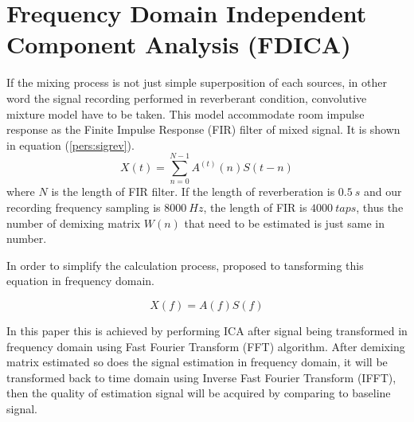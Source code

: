 \documentclass[a4paper]{jpconf}
\begin{document}
\section{Frequency Domain Independent Component Analysis (FDICA)}
If the mixing process is not just simple superposition of each sources, in other word the signal recording performed in reverberant condition, convolutive mixture model have to be taken. This model accommodate room impulse response as the Finite Impulse Response (FIR) filter of mixed signal. It is shown in equation (\ref{pers:sigrev}).
\begin{equation}\label{pers:sigrev}
X(t) = \sum_{n=0}^{N-1}A^{(t)}(n)S(t-n)
\end{equation}
where $N$ is the length of FIR filter. If the length of reverberation is $0.5~s$ and our recording frequency sampling is $8000~Hz$, the length of FIR is $4000~taps$, thus the number of demixing matrix $W(n)$ that need to be estimated is just same in number.

In order to simplify the calculation process, \cite{6} proposed to tansforming this equation in frequency domain.

\begin{equation}
X(f)=A(f)S(f)
\end{equation}

In this paper this is achieved by performing ICA after signal being transformed in frequency domain using Fast Fourier Transform (FFT) algorithm. After demixing matrix estimated so does the signal estimation in frequency domain, it will be transformed back to time domain using Inverse Fast Fourier Transform (IFFT), then the quality of estimation signal will be acquired by comparing to baseline signal.
\end{document}
